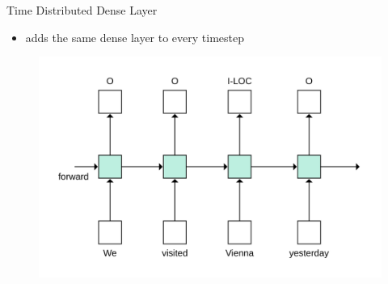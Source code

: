 \documentclass[12pt, tikz]{beamer}
\begin{document}
\begin{frame}[fragile]{Time Distributed Dense Layer}
	\begin{itemize}
		\item adds the same dense layer to every timestep 
	\end{itemize}
	\pause
	\begin{figure}
		\includegraphics[width=\linewidth]{img/lstm_overview.png}
	\end{figure}
\end{frame}
\end{document}
